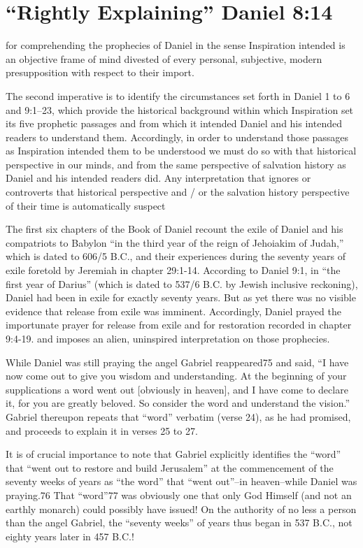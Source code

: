 \chapter{``Rightly Explaining'' Daniel 8:14}
\label{ch:explain}

 for comprehending the prophecies of Daniel in the sense
Inspiration intended is an objective frame of mind divested of every
personal, subjective, modern presupposition with respect to their import.

The second imperative is to identify the circumstances set forth in Daniel 1
to 6 and 9:1--23, which provide the historical background within which
Inspiration set its five prophetic passages and from which it intended
Daniel and his intended readers to understand them. Accordingly, in order to
understand those passages as Inspiration intended them to be understood we
must do so with that historical perspective in our minds, and from the same
perspective of salvation history as Daniel and his intended readers did. Any
interpretation that ignores or controverts that historical perspective and /
or the salvation history perspective of their time is automatically suspect

The first six chapters of the Book of Daniel recount the exile of Daniel and
his compatriots to Babylon ``in the third year of the reign of Jehoiakim of
Judah,'' which is dated to 606/5 B.C., and their experiences during the
seventy years of exile foretold by Jeremiah in chapter 29:1-14. According to
Daniel 9:1, in ``the first year of Darius'' (which is dated to 537/6 B.C. by
Jewish inclusive reckoning), Daniel had been in exile for exactly seventy
years. But as yet there was no visible evidence that release from exile was
imminent. Accordingly, Daniel prayed the importunate prayer for release from
exile and for restoration recorded in chapter 9:4-19. 
and imposes an alien, uninspired interpretation on those prophecies. 

While Daniel was still praying the angel Gabriel reappeared75 and said, ``I
have now come out to give you wisdom and understanding. At the beginning of
your supplications a word went out [obviously in heaven], and I have come to
declare it, for you are greatly beloved. So consider the word and understand
the vision.'' Gabriel thereupon repeats that ``word'' verbatim (verse 24), as
he had promised, and proceeds to explain it in verses 25 to 27. 

It is of crucial importance to note that Gabriel explicitly identifies the
``word'' that ``went out to restore and build Jerusalem'' at the commencement of
the seventy weeks of years as ``the word'' that ``went out''--in heaven--while
Daniel was praying.76 That ``word''77 was obviously one that only God Himself 
(and not an earthly monarch) could possibly have issued! On the authority of
no less a person than the angel Gabriel, the ``seventy weeks'' of years thus
began in 537 B.C., not eighty years later in 457 B.C.!


